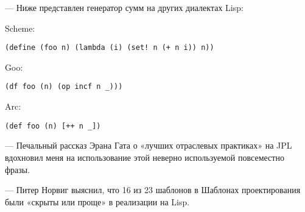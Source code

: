 \documentclass[ebook,12pt,oneside,openany]{memoir}
\begin{document}
— Ниже представлен генератор сумм на других диалектах Lisp:

Scheme:
\begin{verbatim}
(define (foo n) (lambda (i) (set! n (+ n i)) n))
\end{verbatim}
Goo:
\begin{verbatim}
(df foo (n) (op incf n _)))
\end{verbatim}
Arc:
\begin{verbatim}
(def foo (n) [++ n _])
\end{verbatim}

— Печальный рассказ Эрана Гата о «лучших отраслевых практиках» на JPL
вдохновил меня на использование этой неверно используемой повсеместно
фразы.

— Питер Норвиг выяснил, что 16 из 23 шаблонов в Шаблонах
проектирования были «скрыты или проще» в реализации на Lisp.
\end{document}

